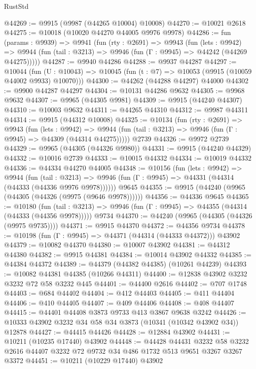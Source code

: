 \begin{lexlean}{RustStd}
\begin{coremodule}
@44269 := @9915 (@9987 (@44265 @10004) @10008)
@44270 := @10021 @2618
@44275 := @10018 (@10020 @44270 @44005 @9976 @9978)
@44286 := fun (params : @9939) =>
  @9941
    (fun (rty : @2691) =>
    @9943
      (fun (lets : @9942) =>
      @9944 (fun (tail : @3213) => @9946 (fun (Γ : @9945) => @44242 (@44269 @44275)))))
@44287 := @9940 @44286
@44288 := @9937 @44287
@44297 := @10044
    (fun (U : @10043) => @10045 (fun (t : @7) => @10053 (@9915 (@10059 @44002 @9933) @10070)))
@44300 := @44262 (@44288 @44297) @44000
@44302 := @9900 @44287 @44297
@44304 := @10131 @44286 @9632
@44305 := @9968 @9632
@44307 := @9965 (@44305 @9981)
@44309 := @9915 (@44240 @44307)
@44310 := @10003 @9632
@44311 := @44265 @44310
@44312 := @9987 @44311
@44314 := @9915 (@44312 @10008)
@44325 := @10134
    (fun (rty : @2691) =>
    @9943
      (fun (lets : @9942) =>
      @9944 (fun (tail : @3213) => @9946 (fun (Γ : @9945) => @44309 (@44314 @44275)))))
    @2739
@44326 := @9972 @2739
@44329 := @9965 (@44305 (@44326 @9980))
@44331 := @9915 (@44240 @44329)
@44332 := @10016 @2739
@44333 := @10015 @44332
@44334 := @10019 @44332
@44336 := @44334 @44270 @44005
@44348 := @10156
    (fun (lets : @9942) =>
    @9944
      (fun (tail : @3213) =>
      @9946 (fun (Γ : @9945) => @44331 (@44314 (@44333 (@44336 @9976 @9978))))))
    @9645
@44355 := @9915 (@44240 (@9965 (@44305 (@44326 (@9975 (@9646 @9978))))))
@44356 := @44336 @9645
@44365 := @10180
    (fun (tail : @3213) => @9946 (fun (Γ : @9945) => @44355 (@44314 (@44333 (@44356 @9978)))))
    @9734
@44370 := @44240 (@9965 (@44305 (@44326 (@9975 @9735))))
@44371 := @9915 @44370
@44372 := @44356 @9734
@44378 := @10198 (fun (Γ : @9945) => @44371 (@44314 (@44333 @44372))) @43902
@44379 := @10082 @44370
@44380 := @10007 @43902
@44381 := @44312 @44380
@44382 := @9915 @44381
@44384 := @10014 @43902 @44332
@44385 := @44384 @44372
@44389 := @44379 (@44382 @44385) (@10261 @44239)
@44393 := @10082 @44381 @44385 (@10266 @44311)
@44400 := @12838 @43902 @3232 @3232 @72 @58 @3232 @445
@44401 := @44400 @2616
@44402 := @707 @1748
@44403 := @684 @44402
@44404 := @412 @44403
@44405 := @411 @44404
@44406 := @410 @44405
@44407 := @409 @44406
@44408 := @408 @44407
@44415 := @44401 @44408 @3873 @9733 @413 @3867 @9638 @3242
@44426 := @10333 @43902 @3232 @34 @58 @34 @3873 (@10341 (@10342 @43902 @34)) @12878
@44427 := @44415 @44426
@44428 := @12884 @43902
@44431 := @10211 (@10235 @17440) @43902
@44448 := @44428
    @44431
    @3232
    @58
    @3232
    @2616
    @44407
    @3232
    @72
    @9732
    @34
    @486
    @1732
    @513
    @9651
    @3267
    @3267
    @3372
@44451 := @10211 (@10229 @17440) @43902

\end{coremodule}
\end{lexlean}
